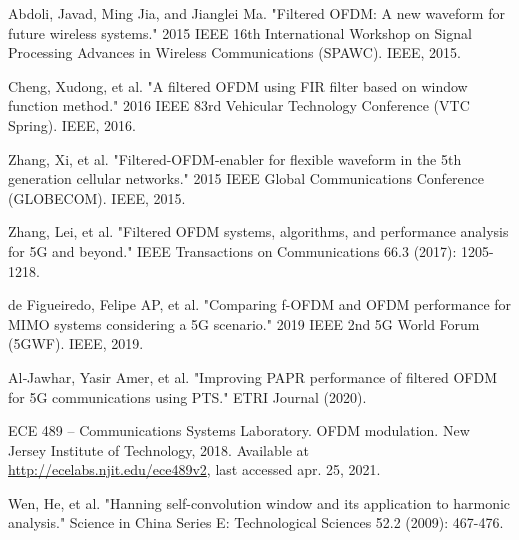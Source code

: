 \begin{thebibliography}{99}
 Abdoli, Javad, Ming Jia, and Jianglei Ma. "Filtered OFDM: A new waveform for future wireless systems." 2015 IEEE 16th International Workshop on Signal Processing Advances in Wireless Communications (SPAWC). IEEE, 2015.

 Cheng, Xudong, et al. "A filtered OFDM using FIR filter based on window function method." 2016 IEEE 83rd Vehicular Technology Conference (VTC Spring). IEEE, 2016.

 Zhang, Xi, et al. "Filtered-OFDM-enabler for flexible waveform in the 5th generation cellular networks." 2015 IEEE Global Communications Conference (GLOBECOM). IEEE, 2015.

 Zhang, Lei, et al. "Filtered OFDM systems, algorithms, and performance analysis for 5G and beyond." IEEE Transactions on Communications 66.3 (2017): 1205-1218.

 de Figueiredo, Felipe AP, et al. "Comparing f-OFDM and OFDM performance for MIMO systems considering a 5G scenario." 2019 IEEE 2nd 5G World Forum (5GWF). IEEE, 2019.

 Al‐Jawhar, Yasir Amer, et al. "Improving PAPR performance of filtered OFDM for 5G communications using PTS." ETRI Journal (2020).

 ECE 489 -- Communications Systems Laboratory. OFDM modulation. New Jersey Institute of Technology, 2018. Available at \url{http://ecelabs.njit.edu/ece489v2}, last accessed apr. 25, 2021.

 Wen, He, et al. "Hanning self-convolution window and its application to harmonic analysis." Science in China Series E: Technological Sciences 52.2 (2009): 467-476.


\end{thebibliography}